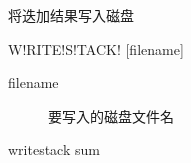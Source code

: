 \label{sss:writestack}

将迭加结果写入磁盘

\begin{SACSTX}
    W!RITE!S!TACK! [filename]
\end{SACSTX}

\begin{description}
\item [filename] 要写入的磁盘文件名
\end{description}

\begin{SACDFT}
writestack sum
\end{SACDFT}
